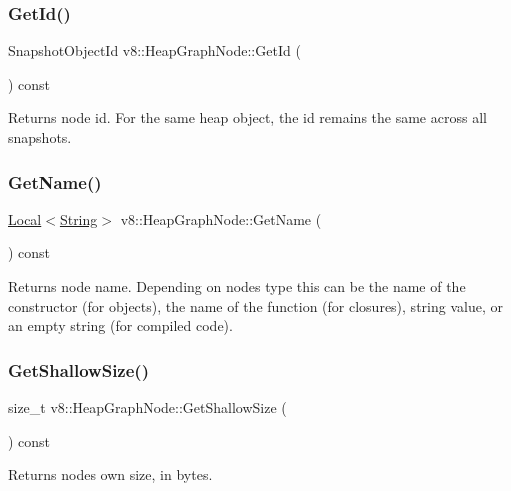 \subsubsection{\texorpdfstring{Get\+Id()}{GetId()}}
{\footnotesize\ttfamily Snapshot\+Object\+Id v8\+::\+Heap\+Graph\+Node\+::\+Get\+Id (\begin{DoxyParamCaption}{ }\end{DoxyParamCaption}) const}

Returns node id. For the same heap object, the id remains the same across all snapshots. \mbox{\label{classv8_1_1HeapGraphNode_a3a9d366c11fe526a11eea8dc878a58c0}} 
\subsubsection{\texorpdfstring{Get\+Name()}{GetName()}}
{\footnotesize\ttfamily \mbox{\hyperlink{classv8_1_1Local}{Local}}$<$\mbox{\hyperlink{classv8_1_1String}{String}}$>$ v8\+::\+Heap\+Graph\+Node\+::\+Get\+Name (\begin{DoxyParamCaption}{ }\end{DoxyParamCaption}) const}

Returns node name. Depending on node\textquotesingle{}s type this can be the name of the constructor (for objects), the name of the function (for closures), string value, or an empty string (for compiled code). \mbox{\label{classv8_1_1HeapGraphNode_ad61965a12cabdc7a4eeeb7e6aade46ba}} 
\subsubsection{\texorpdfstring{Get\+Shallow\+Size()}{GetShallowSize()}}
{\footnotesize\ttfamily size\+\_\+t v8\+::\+Heap\+Graph\+Node\+::\+Get\+Shallow\+Size (\begin{DoxyParamCaption}{ }\end{DoxyParamCaption}) const}

Returns node\textquotesingle{}s own size, in bytes. \mbox{\label{classv8_1_1HeapGraphNode_a9bd100b1338413f6153fe56a3fac60f1}} 
